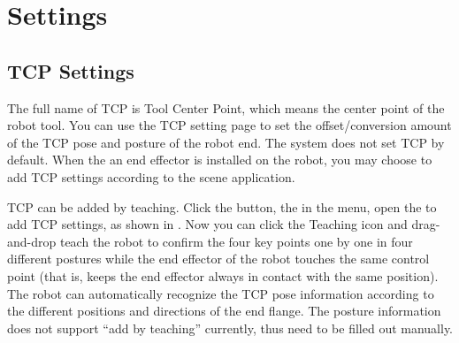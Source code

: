 \section{Settings}
\subsection{TCP Settings}
\label{sec:TCP设置}
The full name of TCP is Tool Center Point, which means the center point of the robot tool. You can use the TCP setting page to set the offset/conversion amount of the TCP pose and posture of the robot end. The system does not set TCP by default. When the an end effector is installed on the robot, you may choose to add TCP settings according to the scene application.

TCP can be added by teaching. Click the  button, the  in the menu, open the  to add TCP settings, as shown in . Now you can click the Teaching icon and drag-and-drop teach the robot to confirm the four key points one by one in four different postures while the end effector of the robot touches the same control point (that is, keeps the end effector always in contact with the same position). The robot can automatically recognize the TCP pose information according to the different positions and directions of the end flange. The posture information does not support ``add by teaching'' currently, thus need to be filled out manually.

